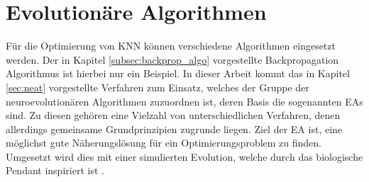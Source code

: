 \section{Evolutionäre Algorithmen}
\label{sec:evolutionary_algos}
Für die Optimierung von \ac{KNN} können verschiedene Algorithmen eingesetzt werden. Der in Kapitel \ref{subsec:backprop_algo} vorgestellte Backpropagation Algorithmus ist hierbei nur ein Beispiel. In dieser Arbeit kommt das in Kapitel \ref{sec:neat} vorgestellte Verfahren zum Einsatz, welches der Gruppe der neuroevolutionären Algorithmen zuzuordnen ist, deren Basis die sogenannten \acp{EA} sind. Zu diesen gehören eine Vielzahl von unterschiedlichen Verfahren, denen allerdings gemeinsame Grundprinzipien zugrunde liegen.
Ziel der \ac{EA} ist, eine möglichst gute Näherungslösung für ein Optimierungsproblem zu finden. Umgesetzt wird dies mit einer simulierten Evolution, welche durch das biologische Pendant inspiriert ist \cite{weicker2015evolutionare}.

